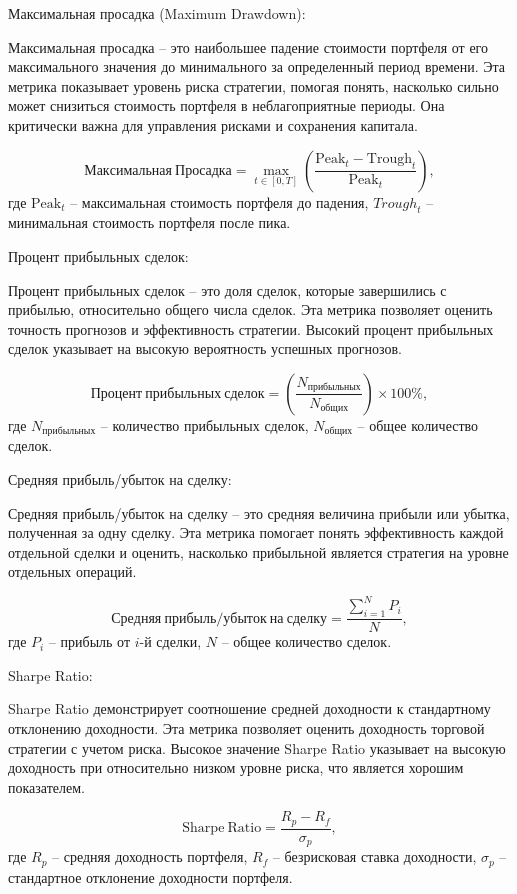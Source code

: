 Максимальная просадка (Maximum Drawdown):

Максимальная просадка – это наибольшее падение стоимости портфеля от его максимального значения до минимального за определенный период времени.
Эта метрика показывает уровень риска стратегии, помогая понять, насколько сильно может снизиться стоимость портфеля в неблагоприятные периоды. Она критически важна для управления рисками и сохранения капитала.

\[
\mathrm{Максимальная\ Просадка} = \max_{t \in [0, T]} \left( \frac{\mathrm{Peak}_t - \mathrm{Trough}_t}{\mathrm{Peak}_t} \right),
\]
где \(\mathrm{Peak}_t\) – максимальная стоимость портфеля до падения, \(\mathit{Trough}_t\) – минимальная стоимость портфеля после пика.

Процент прибыльных сделок:

Процент прибыльных сделок – это доля сделок, которые завершились с прибылью, относительно общего числа сделок. Эта метрика позволяет оценить точность прогнозов и эффективность стратегии. Высокий процент прибыльных сделок указывает на высокую вероятность успешных прогнозов.

\[
\mathrm{Процент\ прибыльных\ сделок} = \left( \frac{N_{\text{прибыльных}}}{N_{\text{общих}}} \right) \times 100\%,
\]
где \(N_{\text{прибыльных}}\) – количество прибыльных сделок, \(N_{\text{общих}}\) – общее количество сделок.

Средняя прибыль/убыток на сделку:

Средняя прибыль/убыток на сделку – это средняя величина прибыли или убытка, полученная за одну сделку. Эта метрика помогает понять эффективность каждой отдельной сделки и оценить, насколько прибыльной является стратегия на уровне отдельных операций.

\[
\mathrm{Средняя\ прибыль/убыток\ на\ сделку} = \frac{\sum_{i=1}^{N} P_i}{N},
\]
где \(P_i\) – прибыль от \(i\)-й сделки, \(N\) – общее количество сделок.

Sharpe Ratio:

Sharpe Ratio демонстрирует соотношение средней доходности к стандартному отклонению доходности. Эта метрика позволяет оценить доходность торговой стратегии с учетом риска. Высокое значение Sharpe Ratio указывает на высокую доходность при относительно низком уровне риска, что является хорошим показателем.

\[
\mathrm{Sharpe\ Ratio} = \frac{R_p - R_f}{\sigma_p},
\]
где \(R_p\) – средняя доходность портфеля, \(R_f\) – безрисковая ставка доходности, \(\sigma_p\) – стандартное отклонение доходности портфеля.

